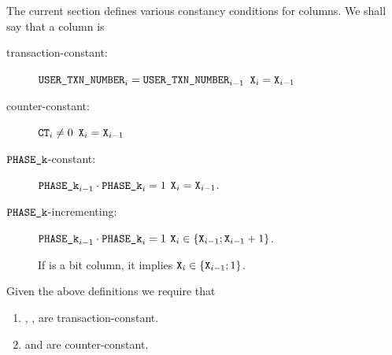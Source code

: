 The current section defines various constancy conditions for columns.
We shall say that a column  is
\begin{description}
	\item[transaction-constant:]
		\If $\texttt{USER}\texttt{\_}\texttt{TXN\_NUMBER}_{i} = \texttt{USER}\texttt{\_}\texttt{TXN\_NUMBER}_{i - 1}$ \Then $\texttt{X}_{i} = \texttt{X}_{i - 1}$
	\item[counter-constant:]
		\If $\texttt{CT}_{i} \neq 0$ \Then $\texttt{X}_{i} = \texttt{X}_{i - 1}$
	\item[$\texttt{PHASE\_k}$-constant:]
		\If   $\texttt{PHASE\_k}_{i - 1} \cdot \texttt{PHASE\_k}_{i} = 1$
		\Then $\texttt{X}_{i} = \texttt{X}_{i - 1}$.
	\item[$\texttt{PHASE\_k}$-incrementing:]
		\If   $\texttt{PHASE\_k}_{i - 1} \cdot \texttt{PHASE\_k}_{i} = 1$
		\Then $\texttt{X}_{i} \in \{\texttt{X}_{i - 1}; \texttt{X}_{i - 1} + 1 \}$.
		
		\saNote{}
		If  is a bit column, it implies $\texttt{X}_{i} \in \{\texttt{X}_{i - 1}; 1 \}$.
\end{description}


Given the above definitions we require that
\begin{enumerate}
	\item \typeZeroTx{}, \typeOneTx{}, \typeTwoTx{} are transaction-constant. 
	\item \lt{} and \lx{} are counter-constant. 
\end{enumerate}
